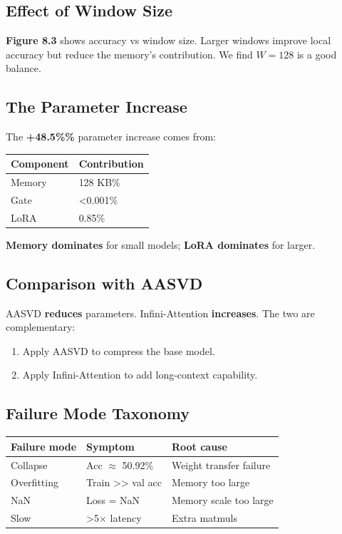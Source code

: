 \subsection{Effect of Window Size}

\textbf{Figure 8.3} shows accuracy vs window size. Larger windows improve 
local accuracy but reduce the memory's contribution. We find $W = 128$ 
is a good balance.

\subsection{The Parameter Increase}

The \textbf{+48.5\%\%} parameter increase comes from:

\begin{table}[H]
\centering
\small
\begin{tabular}{ll}
\toprule
\textbf{Component} & \textbf{Contribution} \\
\midrule
Memory & 128 KB\% \\
Gate & <0.001\% \\
LoRA & 0.85\% \\
\bottomrule
\end{tabular}
\end{table}

\textbf{Memory dominates} for small models; \textbf{LoRA dominates} for larger.

\subsection{Comparison with AASVD}

AASVD \textbf{reduces} parameters. Infini-Attention \textbf{increases}. The two are 
complementary:

\begin{enumerate}
\item Apply AASVD to compress the base model.
\item Apply Infini-Attention to add long-context capability.

\end{enumerate}
\subsection{Failure Mode Taxonomy}

\begin{table}[H]
\centering
\small
\begin{tabular}{lll}
\toprule
\textbf{Failure mode} & \textbf{Symptom} & \textbf{Root cause} \\
\midrule
Collapse & Acc $\approx$ 50.92\% & Weight transfer failure \\
Overfitting & Train >> val acc & Memory too large \\
NaN & Loss = NaN & Memory scale too large \\
Slow & >5$\times$ latency & Extra matmuls \\
\bottomrule
\end{tabular}
\end{table}

